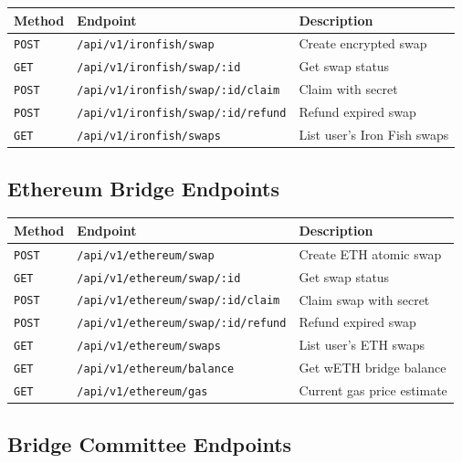 \documentclass[11pt,a4paper]{article}
\begin{document}
\begin{table}[H]
\centering
\begin{tabularx}{\textwidth}{l l X}
\toprule
\textbf{Method} & \textbf{Endpoint} & \textbf{Description} \\
\midrule
\texttt{POST} & \texttt{/api/v1/ironfish/swap} & Create encrypted swap \\
\texttt{GET} & \texttt{/api/v1/ironfish/swap/:id} & Get swap status \\
\texttt{POST} & \texttt{/api/v1/ironfish/swap/:id/claim} & Claim with secret \\
\texttt{POST} & \texttt{/api/v1/ironfish/swap/:id/refund} & Refund expired swap \\
\texttt{GET} & \texttt{/api/v1/ironfish/swaps} & List user's Iron Fish swaps \\
\bottomrule
\end{tabularx}
\end{table}

\subsection{Ethereum Bridge Endpoints}

\begin{table}[H]
\centering
\begin{tabularx}{\textwidth}{l l X}
\toprule
\textbf{Method} & \textbf{Endpoint} & \textbf{Description} \\
\midrule
\texttt{POST} & \texttt{/api/v1/ethereum/swap} & Create ETH atomic swap \\
\texttt{GET} & \texttt{/api/v1/ethereum/swap/:id} & Get swap status \\
\texttt{POST} & \texttt{/api/v1/ethereum/swap/:id/claim} & Claim swap with secret \\
\texttt{POST} & \texttt{/api/v1/ethereum/swap/:id/refund} & Refund expired swap \\
\texttt{GET} & \texttt{/api/v1/ethereum/swaps} & List user's ETH swaps \\
\texttt{GET} & \texttt{/api/v1/ethereum/balance} & Get wETH bridge balance \\
\texttt{GET} & \texttt{/api/v1/ethereum/gas} & Current gas price estimate \\
\bottomrule
\end{tabularx}
\end{table}

\subsection{Bridge Committee Endpoints}
\end{document}
